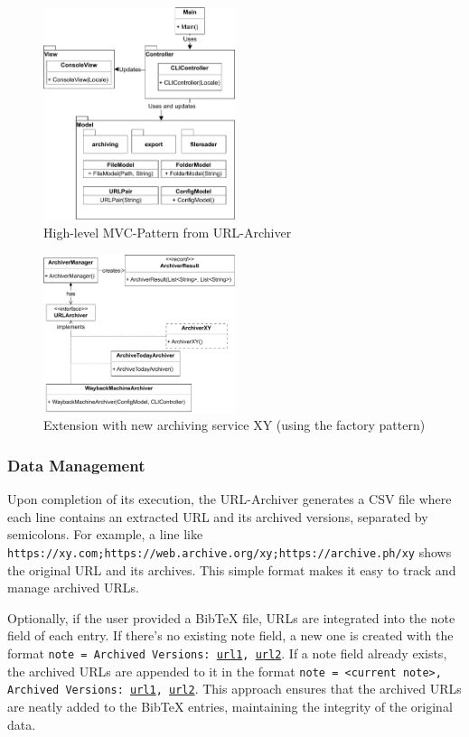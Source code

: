\begin{figure}
	\includegraphics[width=0.5\textwidth]{./diagrams/mvc_diagram-Highlevel_MVC.pdf}
	\centering
	\caption{High-level MVC-Pattern from URL-Archiver}
	\label{fig:mvc_highlevel}
\end{figure}

\begin{figure}
	\includegraphics[width=0.5\textwidth]{./diagrams/URL_Archiver_Class_Diagram-ArchiverManager.pdf}
	\centering
	\caption{Extension with new archiving service XY (using the factory pattern)}
	\label{fig:factory_pattern_archiving_services}
\end{figure}

\subsubsection{Data Management}
Upon completion of its execution, the URL-Archiver generates a CSV file where each line contains an extracted URL and its archived versions, separated by semicolons. For example, a line like \texttt{https://xy.com;https://web.archive.org/xy;https://archive.ph/xy} shows the original URL and its archives. This simple format makes it easy to track and manage archived URLs. 

Optionally, if the user provided a BibTeX file, URLs are integrated into the note field of each entry. If there's no existing note field, a new one is created with the format \texttt{note = {Archived Versions: \url{url1}, \url{url2}}}. If a note field already exists, the archived URLs are appended to it in the format \texttt{note = {<current note>, Archived Versions: \url{url1}, \url{url2}}}. This approach ensures that the archived URLs are neatly added to the BibTeX entries, maintaining the integrity of the original data.

